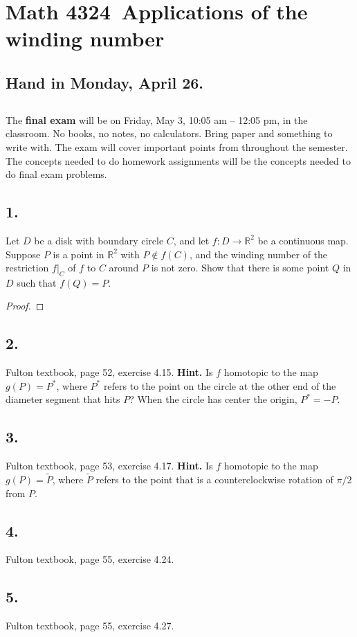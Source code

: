 \documentclass{amsart}
\theoremstyle{plain}
\theoremstyle{definition}
\theoremstyle{remark}
\begin{document}
\section*{Math 4324\  Applications of the winding number} 

\subsection*{Hand in Monday, April 26.} 

\vspace{.25in}
\subsection*{} The {\bf final exam} will be on Friday, May 3, 10:05 am -- 12:05 pm, in the classroom. No books, no notes, no calculators. Bring paper and something to write with. The exam will cover important points from throughout the semester. The concepts needed to do homework assignments will be the concepts needed to do  final exam problems. 

\vspace{.25in}
\noindent
\subsection*{1.} Let $D$ be  a disk with boundary circle $C$, and let $f: D\to \mathbb{R}^2$ be a continuous map. Suppose $P$ is a point in $\mathbb{R}^2$ with $P\not \in f(C)$, and the winding number of the restriction $f|_C$ of $f$ to $C$ around $P$ is not zero. Show that there is some point $Q$ in $D$ such that $f(Q) = P$.

\begin{proof}
    
\end{proof}

\vspace{.15in}
\noindent
\subsection*{2.} Fulton textbook, page 52, exercise 4.15. {\bf  Hint.} Is $f$ homotopic to the map $g(P) = P^*$, where $P^*$ refers to the point on the circle at the other end of the diameter segment that hits $P$? When the circle has center the origin, $P^* = -P$. 


\vspace{.15in}
\noindent
\subsection*{3.} Fulton textbook, page 53, exercise 4.17. {\bf  Hint.} Is $f$ homotopic to the map $g(P) = \widetilde{P}$, where $\widetilde{P}$ refers to the point that is a counterclockwise rotation of $\pi /2$ from $P$. 

\vspace{.15in}
\noindent
\subsection*{4.} Fulton textbook, page 55, exercise 4.24.


\vspace{.15in}
\noindent
\subsection*{5.} Fulton textbook, page 55, exercise 4.27.




 
\end{document}
